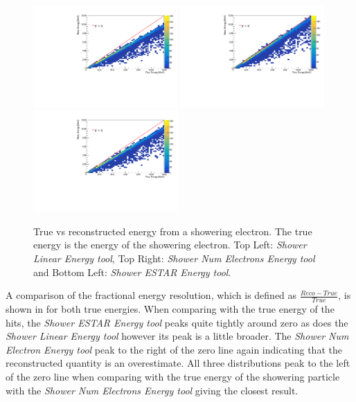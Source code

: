 \begin{figure}[h!]
    \centering
    \includegraphics[width = 0.49\textwidth]{figures-chap4/true_vs_reco_showeringE_linear.pdf}
    \includegraphics[width = 0.49\textwidth]{figures-chap4/true_vs_reco_showeringE_oldmethod.pdf}
    \includegraphics[width = 0.49\textwidth]{figures-chap4/true_vs_reco_showeringE_ESTAR.pdf}
    \captionsetup{width=0.45\textwidth}
    \parbox[b]{0.49\textwidth}%
  {
    \caption[True vs reconstructed energy from a showering electron. The true energy is the energy of the showering electron.]
    {True vs reconstructed energy from a showering electron. The true energy is the energy of the showering electron. Top Left: \textit{Shower Linear Energy tool}, Top Right: \textit{Shower Num Electrons Energy tool} and Bottom Left: \textit{Shower ESTAR Energy tool}. \\}
    \label{fig:reco_vs_true_showeringE}}
\end{figure}

\newpage
A comparison of the fractional energy resolution, which is defined as $\frac{Reco - True}{True}$, is shown in  for both true energies. When comparing with the true energy of the hits, the \textit{Shower ESTAR Energy tool} peaks quite tightly around zero as does the \textit{Shower Linear Energy tool} however its peak is a little broader. The \textit{Shower Num Electron Energy tool} peak to the right of the zero line again indicating that the reconstructed quantity is an overestimate. All three distributions peak to the left of the zero line when comparing with the true energy of the showering particle with the \textit{Shower Num Electrons Energy tool} giving the closest result. 

